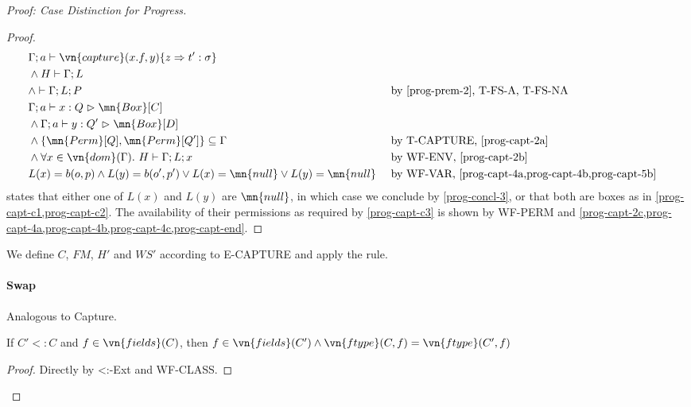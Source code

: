 \begin{proof}[Proof: Case Distinction for Progress]
\begin{proof}
\begin{alignat}{3}
& \Gamma ; a \vdash \vn{capture}(x.f, y) \{ z \Rightarrow t' : \sigma \} \label{prog-capt-2a}\\
& \wedge H \vdash \Gamma; L \label{prog-capt-2b}\\
& \wedge \vdash \Gamma; L; P \label{prog-capt-2c} && \text{ by \cref{prog-prem-2}, T-FS-A, T-FS-NA}\\
& \Gamma; a \vdash x : Q \vartriangleright \mn{Box}[C] \label{prog-capt-4a}\\
& \wedge \Gamma; a \vdash y : Q' \vartriangleright \mn{Box}[D] \label{prog-capt-4b}\\
& \wedge \{\mn{Perm}[Q], \mn{Perm}[Q']\} \subseteq \Gamma \label{prog-capt-4c}
&& \text{ by T-CAPTURE, \cref{prog-capt-2a}}\\
& \wedge \forall x \in \vn{dom}(\Gamma).\ H \vdash \Gamma; L; x \label{prog-capt-5b} && \text{ by WF-ENV, \cref{prog-capt-2b}}\\
& L(x) = b(o,p) \wedge L(y) = b(o', p') \vee L(x) = \mn{null} \vee L(y) = \mn{null} \label{prog-capt-end}&& \text{ by WF-VAR, \cref{prog-capt-4a,prog-capt-4b,prog-capt-5b}}
\end{alignat}
 states that either one of $L(x)$ and $L(y)$ are $\mn{null}$, in which case we conclude by \cref{prog-concl-3}, or that both are boxes as in \cref{prog-capt-c1,prog-capt-c2}. The availability of their permissions as required by \cref{prog-capt-c3} is shown by WF-PERM and \cref{prog-capt-2c,prog-capt-4a,prog-capt-4b,prog-capt-4c,prog-capt-end}.
\end{proof}

We define $C$, $FM$, $H'$ and $WS'$ according to E-CAPTURE and apply the rule.

\paragraph{Swap}
Analogous to Capture.

\begin{lemma}\label{prog-select-lemma-4}
    If $C' <: C$ and $f \in \vn{fields}(C)$, then $f \in \vn{fields}(C') \wedge \vn{ftype}(C, f) = \vn{ftype}(C', f)$
\end{lemma}
\begin{proof}
    Directly by <:-Ext and WF-CLASS.
\end{proof}


\end{proof}
